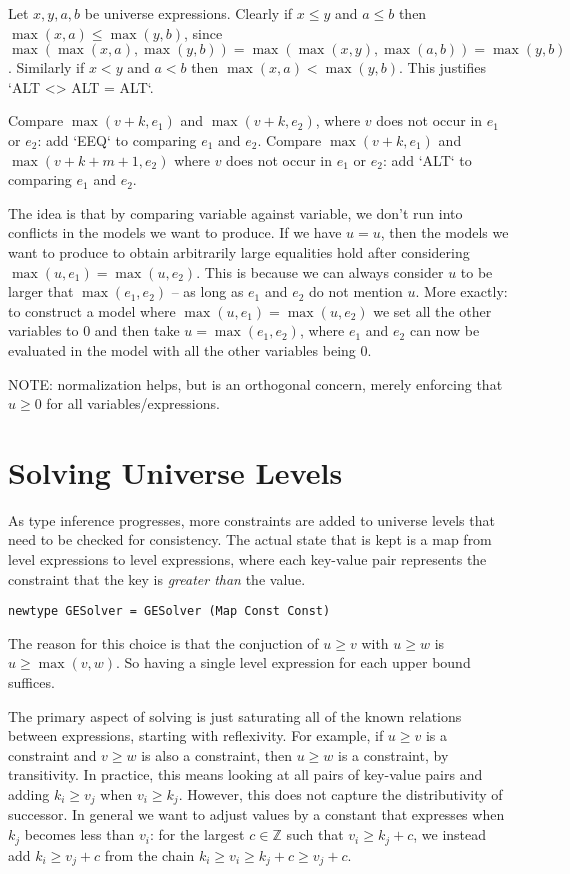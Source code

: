 \documentclass[11pt, twoside, reqno]{book}
\begin{document}
Let \(x, y, a, b\) be universe expressions.
Clearly if \(x \le y\) and \(a \le b\) then \(\max(x,a) \le \max(y,b)\), since \(\max(\max(x,a),\max(y,b)) = \max(\max(x,y),\max(a,b)) = \max(y,b)\).
Similarly if \(x < y\) and \(a < b\) then \(\max(x,a) < \max(y,b)\).
This justifies \inHS`ALT <> ALT = ALT`.

Compare \(\max(v+k, e_1)\) and \(\max(v+k, e_2)\), where \(v\) does not occur in \(e_1\) or \(e_2\): add \inHS`EEQ` to comparing \(e_1\) and \(e_2\).
Compare \(\max(v+k, e_1)\) and \(\max(v+k+m+1, e_2)\)  where \(v\) does not occur in \(e_1\) or \(e_2\): add \inHS`ALT` to comparing \(e_1\) and \(e_2\).


The idea is that by comparing variable against variable, we don't run into conflicts in the models we want to produce.
If we have \(u = u\), then the models we want to produce to obtain arbitrarily large equalities hold after considering \(\max(u, e_1) = \max(u, e_2)\).
This is because we can always consider \(u\) to be larger that \(\max(e_1, e_2)\) -- as long as \(e_1\) and \(e_2\) do not mention \(u\).
More exactly: to construct a model where \(\max(u, e_1) = \max(u, e_2)\) we set all the other variables to \(0\) and then take \(u = \max(e_1, e_2)\), where \(e_1\) and \(e_2\) can now be evaluated in the model with all the other variables being \(0\).

NOTE: normalization helps, but is an orthogonal concern, merely enforcing that \(u \ge 0\) for all variables/expressions.


\section{Solving Universe Levels}
\label{solv-uni-lvl}

As type inference progresses, more constraints are added to universe levels that need to be checked for consistency.
The actual state that is kept is a map from level expressions to level expressions, where each key-value pair represents the constraint that the key is \emph{greater than} the value.

\begin{verbatim}
newtype GESolver = GESolver (Map Const Const)
\end{verbatim}

The reason for this choice is that the conjuction of \(u \ge v\) with \(u \ge w\) is \(u \ge \max(v, w)\).
So having a single level expression for each upper bound suffices.

The primary aspect of solving is just saturating all of the known relations between expressions, starting with reflexivity.
For example, if \(u \ge v\) is a constraint and \(v \ge w\) is also a constraint, then \(u \ge w\) is a constraint, by transitivity.
In practice, this means looking at all pairs of key-value pairs and adding \(k_i \ge v_j\) when \(v_i \ge k_j\).
However, this does not capture the distributivity of successor.
In general we want to adjust values by a constant that expresses when \(k_j\) becomes less than \(v_i\): for the largest \(c \in \mathbb{Z}\) such that \(v_i \ge k_j + c\), we instead add \(k_i \ge v_j + c\) from the chain \(k_i \ge v_i \ge k_j + c \ge v_j + c\).
\end{document}

